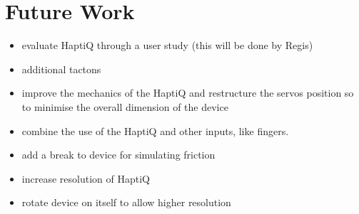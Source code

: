\chapter{Future Work}

\begin{itemize}
	\item evaluate HaptiQ through a user study (this will be done by Regis)
	\item additional tactons
    \item improve the mechanics of the HaptiQ and restructure the servos position so to minimise the overall dimension of the device
    \item combine the use of the HaptiQ and other inputs, like fingers. 
    \item add a break to device for simulating friction
    \item increase resolution of HaptiQ
    \item rotate device on itself to allow higher resolution
\end{itemize}